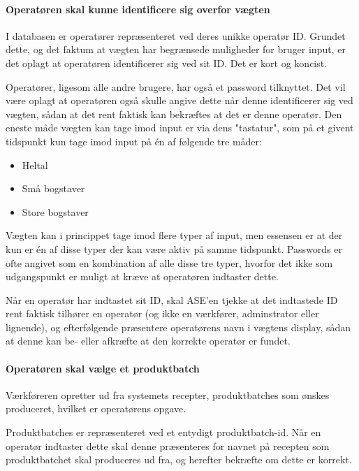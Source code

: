 \documentclass[a4paper]{article}
\begin{document}
\paragraph{Operatøren skal kunne identificere sig overfor vægten} %

I databasen er operatører repræsenteret ved deres unikke operatør ID. Grundet dette, og det faktum at vægten har begrænsede muligheder for bruger input, er det oplagt at operatøren identificerer sig ved sit ID. Det er kort og koncist.

Operatører, ligesom alle andre brugere, har også et password tilknyttet. Det vil være oplagt at operatøren også skulle angive dette når denne identificerer sig ved vægten, sådan at det rent faktisk kan bekræftes at det er denne operatør. Den eneste måde vægten kan tage imod input er via dens "tastatur", som på et givent tidspunkt kun tage imod input på én af følgende tre måder:
\begin{itemize}
  \item Heltal
  \item Små bogstaver
  \item Store bogstaver
\end{itemize}
Vægten kan i princippet tage imod flere typer af input, men essensen er at der kun er én af disse typer der kan være aktiv på samme tidspunkt. Passwords er ofte angivet som en kombination af alle disse tre typer, hvorfor det ikke som udgangspunkt er muligt at kræve at operatøren indtaster dette.

Når en operatør har indtastet sit ID, skal ASE'en tjekke at det indtastede ID rent faktisk tilhører en operatør (og ikke en værkfører, adminstrator eller lignende), og efterfølgende præsentere operatørens navn i vægtens display, sådan at denne kan be- eller afkræfte at den korrekte operatør er fundet.


\paragraph{Operatøren skal vælge et produktbatch} %

Værkføreren opretter ud fra systemets recepter, produktbatches som ønskes produceret, hvilket er operatørens opgave.

Produktbatches er repræsenteret ved et entydigt produktbatch-id. Når en operatør indtaster dette skal denne præsenteres for navnet på recepten som produktbatchet skal produceres ud fra, og herefter bekræfte om dette er korrekt.
\end{document}

